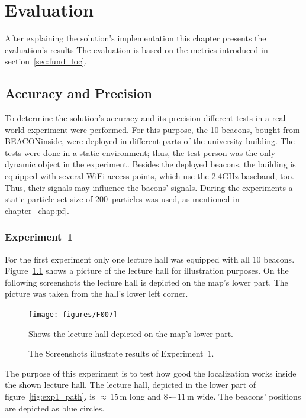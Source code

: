 \chapter{Evaluation} \label{chap:evaluation}
After explaining the solution's implementation this chapter presents the evaluation's results The evaluation is based on the metrics introduced in section~\ref{sec:fund_loc}.

\section{Accuracy and Precision}
To determine the solution's accuracy and its precision different tests in a real world experiment were performed. For this purpose, the 10 beacons, bought from BEACONinside, were deployed in different parts of the university building. The tests were done in a static environment; thus, the test person was the only dynamic object in the experiment. Besides the deployed beacons, the building is equipped with several WiFi access points, which use the 2.4GHz baseband, too. Thus, their signals may influence the bacons' signals. During the experiments a static particle set size of 200~particles was used, as mentioned in chapter~\ref{chap:pf}.

\subsection*{Experiment~1}
For the first experiment only one lecture hall was equipped with all 10 beacons. Figure~\ref{fig:f007} shows a picture of the lecture hall for illustration purposes. On the following screenshots the lecture hall is depicted on the map's lower part. The picture was taken from the hall's lower left corner.

\begin{figure}
	\texttt{[image: figures/F007]}
	\caption{Shows the lecture hall depicted on the map's lower part.}
	\label{fig:f007}
\end{figure}

\begin{figure}
	
	\caption{The Screenshots illustrate results of Experiment~1.}
	\label{fig:exp1_screenshot}
\end{figure}

The purpose of this experiment is to test how good the localization works inside the shown lecture hall. The lecture hall, depicted in the lower part of figure~\ref{fig:exp1_path}, is  $\approx$\,15\,m long and 8\,-–\,11\,m wide. The beacons' positions are depicted as blue circles.

